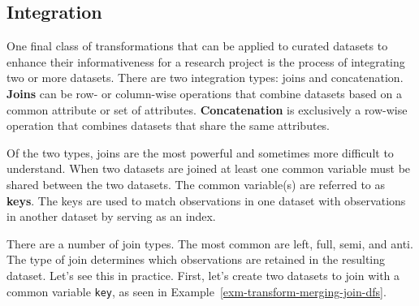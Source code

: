 \documentclass[
  letterpaper,
  krantz1]{latex/krantz-mod}
\theoremstyle{definition}
\theoremstyle{definition}
\theoremstyle{remark}
\begin{document}
\subsection{Integration}\label{sec-transform-integration}

One final class of transformations that can be applied to curated
datasets to enhance their informativeness for a research project is the
process of integrating two or more datasets.
There are two integration types: joins and concatenation.
\textbf{Joins} can be row- or column-wise
operations that combine datasets based on a common attribute or set of
attributes. \textbf{Concatenation} is
exclusively a row-wise operation that combines datasets that share the
same attributes.

Of the two types, joins are the most powerful and sometimes more
difficult to understand. When two datasets are joined at least one
common variable must be shared between the two datasets. The common
variable(s) are referred to as \textbf{keys}. The keys
are used to match observations in one dataset with observations in
another dataset by serving as an index.

There are a number of join types. The most common are left, full, semi,
and anti. The type of join determines which observations are retained in
the resulting dataset. Let's see this in practice. First, let's create
two datasets to join with a common variable \texttt{key}, as seen in
Example~\ref{exm-transform-merging-join-dfs}.
\end{document}
